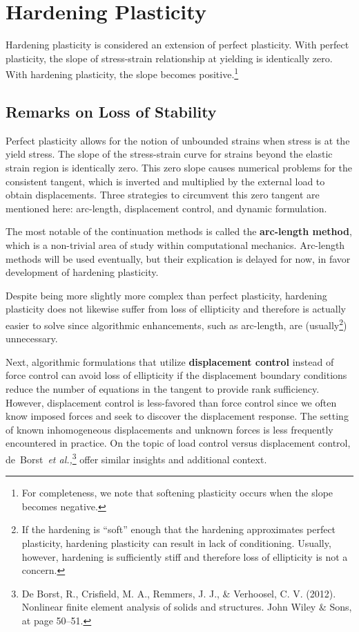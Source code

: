 \section{Hardening Plasticity}

Hardening plasticity is considered an extension of perfect plasticity.  With 
perfect plasticity, the slope of stress-strain relationship at yielding is
identically zero.  With hardening plasticity, the slope becomes 
positive.\footnote{For completeness, we note that softening plasticity occurs
when the slope becomes negative.}   

\subsection{Remarks on Loss of Stability}
Perfect plasticity allows for the notion of unbounded 
strains when stress is at the yield stress. 
The slope of the stress-strain curve for strains 
beyond the elastic strain region is identically zero.
This zero slope causes numerical problems for the 
consistent tangent, which is inverted and multiplied by
the external load to obtain displacements.  
Three strategies to circumvent this zero tangent are 
mentioned here:  arc-length, displacement control, and dynamic formulation.

The most notable of the continuation methods is called the  
{\bf arc-length method}, 
which is a non-trivial area of study within computational mechanics.  
Arc-length methods will be used eventually, but their
explication is delayed for now, in favor development of hardening plasticity.  

Despite being more slightly more complex than
perfect plasticity, hardening plasticity does not 
likewise suffer from loss of ellipticity and therefore is actually easier to solve since
algorithmic enhancements, such as arc-length, are 
(usually\footnote{If the hardening is ``soft'' enough that the hardening 
approximates perfect plasticity, hardening plasticity can 
result in lack of conditioning.  Usually, however, 
hardening is sufficiently stiff and
therefore loss of ellipticity is not a concern.}) unnecessary.

Next, algorithmic formulations that utilize {\bf displacement control} 
instead of force control can avoid loss of ellipticity if the 
displacement boundary conditions reduce the number of equations 
in the tangent to provide rank sufficiency.  
However, displacement control is less-favored than 
force control since we often know imposed forces and 
seek to discover the displacement response.  The setting of 
known inhomogeneous displacements and unknown forces is
less frequently encountered in practice.  
On the topic of load control versus displacement 
control, de~Borst~{\em et al.,}\footnote{De Borst, R., 
Crisfield, M. A., Remmers, J. J., \& Verhoosel, C. V. (2012). 
Nonlinear finite element analysis of solids and structures. John Wiley \& Sons, at page 50--51.} offer similar insights and additional context. 

